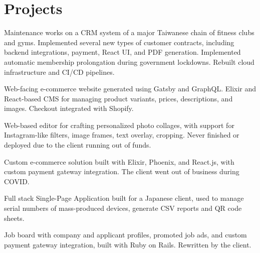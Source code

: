 \section{Projects}
\vspace*{-6pt}


\small
Maintenance works on a CRM system of a major Taiwanese chain of fitness clubs and gyms.
Implemented several new types of customer contracts, including backend integrations, payment, React UI,
and PDF generation. Implemented automatic membership prolongation during government lockdowns.
Rebuilt cloud infrastructure and CI/CD pipelines.


\small
Web-facing e-commerce website generated using Gatsby and GraphQL. Elixir and React-based CMS for managing product variants, prices, descriptions, and images.
Checkout integrated with Shopify.


\small
Web-based editor for crafting personalized photo collages, with support for Instagram-like filters, image frames, text overlay, cropping.
Never finished or deployed due to the client running out of funds.


\small
Custom e-commerce solution built with Elixir, Phoenix, and React.js, with custom payment gateway integration.
The client went out of business during COVID.


\small
Full stack Single-Page Application built for a Japanese client, used to manage serial numbers of mass-produced
devices, generate CSV reports and QR code sheets.


\small
Job board with company and applicant profiles, promoted job ads, and custom payment gateway integration, built with Ruby on Rails. Rewritten by the client.

